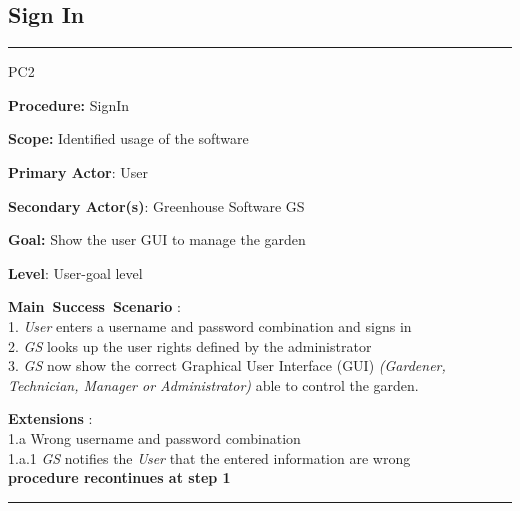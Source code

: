 \subsection{Sign In}
\vspace{0.5cm}
\hrule
\hfill \break
\begin{lyxlist}{PC2}
\small{
\item [\textbf{Procedure:}] SignIn
\item [\textbf{Scope:}] Identified usage of the software
\item [\textbf{Primary Actor}:] User
\item [\textbf{Secondary Actor(s)}:] Greenhouse Software GS
\item [\textbf{Goal:}] Show the user GUI to manage the garden
\item [\textbf{Level}:] User-goal level
\item [\textbf{Main~Success~Scenario}]:\\
1. \emph{User} enters a username and password combination and signs in\\
2. \emph{GS} looks up the user rights defined by the administrator\\
3. \emph{GS} now show the correct Graphical User Interface (GUI) \emph{(Gardener, Technician, Manager or Administrator)} able to control the garden.
\item [\textbf{Extensions}]:\\
1.a Wrong username and password combination\\
\hspace*{0.5cm} 1.a.1 \emph{GS} notifies the \emph{User} that the entered information are wrong\\
\hspace*{0.5cm} \textbf{procedure recontinues at step 1}
}
\end{lyxlist}
\hrule
\vspace{0.5cm}



